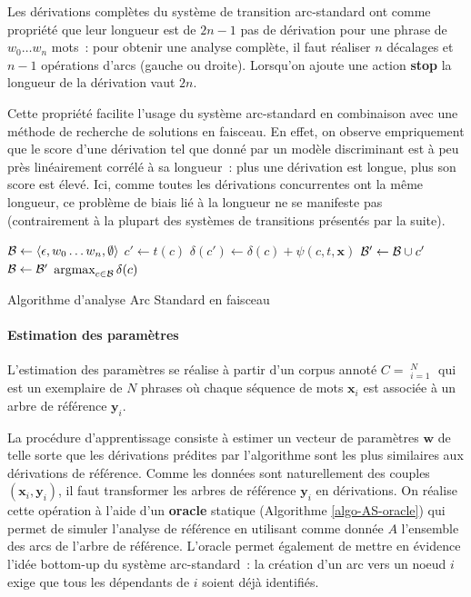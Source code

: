 \documentclass[11pt,openany]{book}
\begin{document}
Les dérivations complètes du système de transition arc-standard ont comme
propriété que leur longueur est de $2n-1$ pas de dérivation pour une
phrase de $w_0\ldots w_n$ mots~:  pour obtenir une analyse complète,
il faut réaliser $n$ décalages et $n-1$ opérations d'arcs (gauche ou
droite).
Lorsqu'on ajoute une action {\bf stop} la longueur de la dérivation
vaut $2n$.

Cette propriété facilite l'usage du système arc-standard en
combinaison avec une méthode de recherche de solutions en faisceau.
En effet, on observe empriquement que le score d'une dérivation tel
que donné par un modèle discriminant est à peu près linéairement
corrélé à sa longueur~: plus une dérivation est longue, plus son score
est élevé. Ici, comme toutes les dérivations concurrentes ont la même
longueur, ce problème de biais lié à la longueur ne se manifeste pas
(contrairement à la plupart des systèmes de transitions présentés par la suite).

\begin{algorithm}[htbp]
\begin{algorithmic}[0]
\State ${\cal B} \gets \langle \epsilon, w_0\ldots w_n,\emptyset\rangle$
\State $c' \gets t(c)$
\State $\delta(c') \gets \delta(c) + \psi(c,t,\mathbf{x})$
\State ${\cal B}' \gets {\cal B}\cup c'$
\EndFor
\EndFor
\State ${\cal B} \gets {\cal B}'$
\EndFor
\State \Return $\mathop{\text{argmax}}_{c\in \cal B} \delta(c)$
\EndFunction
\end{algorithmic}
\caption{\label{algo-arc-standard}Algorithme d'analyse Arc Standard en
faisceau}
\end{algorithm}


\paragraph{Estimation des paramètres}
L'estimation des paramètres se réalise à partir d'un 
corpus annoté $C = \mathop{(\mathbf{x}_i,\mathbf{y}_i)}^N_{i=1}$ qui est un
exemplaire de $N$ phrases où chaque séquence de mots $\mathbf{x}_i$
est associée à un arbre de référence $\mathbf{y}_i$.

La procédure d'apprentissage consiste à estimer un vecteur de
paramètres $\mathbf{w}$ de telle sorte que les dérivations prédites par
l'algorithme sont les plus similaires aux dérivations de référence.
Comme les données sont naturellement des couples
$(\mathbf{x}_i,\mathbf{y}_i)$, il faut transformer les arbres de
référence $\mathbf{y}_i$ en dérivations.
On réalise cette opération à l'aide d'un {\bf oracle} statique
(Algorithme \ref{algo-AS-oracle}) qui permet de simuler l'analyse de référence en utilisant
comme donnée $A$ l'ensemble des arcs de l'arbre de référence. L'oracle
permet également de mettre en évidence l'idée bottom-up du système arc-standard~: la
création d'un arc vers un noeud $i$ exige que tous les dépendants 
de $i$ soient déjà identifiés.
\end{document}
